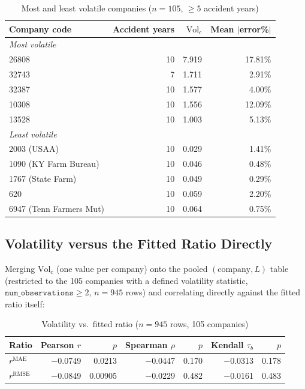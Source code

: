 \documentclass[11pt]{article}
\newcommand{\rmae}{r^{\text{MAE}}}
\newcommand{\rrmse}{r^{\text{RMSE}}}
\begin{document}
\begin{table}[h]
\centering
\caption{Most and least volatile companies ($n=105$, $\ge5$ accident years)}
\begin{tabular}{lrrr}
\toprule
Company code & Accident years & $\text{Vol}_c$ & Mean $|$error\%$|$ \\
\midrule
\multicolumn{4}{l}{\textit{Most volatile}} \\
26808 & 10 & 7.919 & 17.81\% \\
32743 & 7  & 1.711 & 2.91\% \\
32387 & 10 & 1.577 & 4.00\% \\
10308 & 10 & 1.556 & 12.09\% \\
13528 & 10 & 1.003 & 5.13\% \\
\midrule
\multicolumn{4}{l}{\textit{Least volatile}} \\
2003 (USAA) & 10 & 0.029 & 1.41\% \\
1090 (KY Farm Bureau) & 10 & 0.046 & 0.48\% \\
1767 (State Farm) & 10 & 0.049 & 0.29\% \\
620 & 10 & 0.059 & 2.20\% \\
6947 (Tenn Farmers Mut) & 10 & 0.064 & 0.75\% \\
\bottomrule
\end{tabular}
\end{table}

\subsection{Volatility versus the Fitted Ratio Directly}

Merging $\text{Vol}_c$ (one value per company) onto the pooled $(\text{company},L)$ table
(restricted to the 105 companies with a defined volatility statistic, $\texttt{num\_observations}
\ge 2$, $n=945$ rows) and correlating directly against the fitted ratio itself:

\begin{table}[h]
\centering
\caption{Volatility vs.\ fitted ratio ($n=945$ rows, 105 companies)}
\begin{tabular}{lrrrrrr}
\toprule
Ratio & Pearson $r$ & $p$ & Spearman $\rho$ & $p$ & Kendall $\tau_b$ & $p$ \\
\midrule
$\rmae$  & $-$0.0749 & 0.0213 & $-$0.0447 & 0.170 & $-$0.0313 & 0.178 \\
$\rrmse$ & $-$0.0849 & 0.00905 & $-$0.0229 & 0.482 & $-$0.0161 & 0.483 \\
\bottomrule
\end{tabular}
\end{table}
\end{document}
